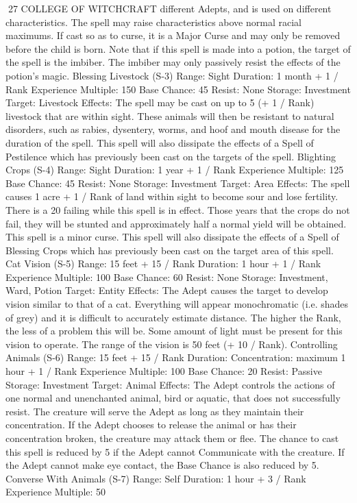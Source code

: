 \documentclass[a4paper]{article}
\begin{document}
\begin{multicols}{3}
27 COLLEGE OF WITCHCRAFT
different Adepts, and is used on different characteristics. The spell may raise characteristics above
normal racial maximums. If cast so as to curse, it is
a Major Curse and may only be removed before the
child is born. Note that if this spell is made into a
potion, the target of the spell is the imbiber. The
imbiber may only passively resist the effects of the
potion’s magic.
Blessing Livestock (S-3)
Range: Sight
Duration: 1 month + 1 / Rank
Experience Multiple: 150
Base Chance: 45%
Resist: None
Storage: Investment
Target: Livestock
Effects: The spell may be cast on up to 5 (+ 1 /
Rank) livestock that are within sight. These animals will then be resistant to natural disorders,
such as rabies, dysentery, worms, and hoof and
mouth disease for the duration of the spell. This
spell will also dissipate the effects of a Spell of
Pestilence which has previously been cast on the
targets of the spell.
Blighting Crops (S-4)
Range: Sight
Duration: 1 year + 1 / Rank
Experience Multiple: 125
Base Chance: 45%
Resist: None
Storage: Investment
Target: Area
Effects: The spell causes 1 acre + 1 / Rank of land
within sight to become sour and lose fertility.
There is a 20%
failing while this spell is in effect. Those years that
the crops do not fail, they will be stunted and approximately half a normal yield will be obtained.
This spell is a minor curse. This spell will also
dissipate the effects of a Spell of Blessing Crops
which has previously been cast on the target area
of this spell.
Cat Vision (S-5)
Range: 15 feet + 15 / Rank
Duration: 1 hour + 1 / Rank
Experience Multiple: 100
Base Chance: 60%
Resist: None
Storage: Investment, Ward, Potion
Target: Entity
Effects: The Adept causes the target to develop
vision similar to that of a cat. Everything will
appear monochromatic (i.e. shades of grey) and it
is difficult to accurately estimate distance. The
higher the Rank, the less of a problem this will be.
Some amount of light must be present for this
vision to operate. The range of the vision is 50 feet
(+ 10 / Rank).
Controlling Animals (S-6)
Range: 15 feet + 15 / Rank
Duration: Concentration: maximum 1 hour + 1 /
Rank
Experience Multiple: 100
Base Chance: 20%
Resist: Passive
Storage: Investment
Target: Animal
Effects: The Adept controls the actions of one
normal and unenchanted animal, bird or aquatic,
that does not successfully resist. The creature will
serve the Adept as long as they maintain their
concentration. If the Adept chooses to release the
animal or has their concentration broken, the creature may attack them or flee. The chance to cast
this spell is reduced by 5 if the Adept cannot
Communicate with the creature. If the Adept cannot make eye contact, the Base Chance is also
reduced by 5.
Converse With Animals (S-7)
Range: Self
Duration: 1 hour + 3 / Rank
Experience Multiple: 50


\end{multicols}
\end{document}
